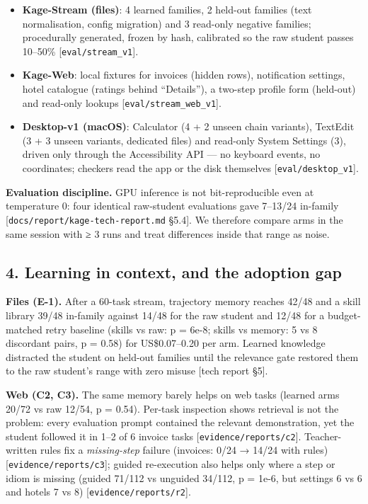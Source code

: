 \documentclass[
  10pt,
]{article}
\providecommand{\tightlist}{%
  \setlength{\itemsep}{0pt}\setlength{\parskip}{0pt}}
\begin{document}
\begin{itemize}
\tightlist
\item
  \textbf{Kage-Stream (files)}: 4 learned families, 2 held-out families
  (text normalisation, config migration) and 3 read-only negative
  families; procedurally generated, frozen by hash, calibrated so the
  raw student passes 10--50\% {[}\texttt{eval/stream\_v1}{]}.
\item
  \textbf{Kage-Web}: local fixtures for invoices (hidden rows),
  notification settings, hotel catalogue (ratings behind ``Details''), a
  two-step profile form (held-out) and read-only lookups
  {[}\texttt{eval/stream\_web\_v1}{]}.
\item
  \textbf{Desktop-v1 (macOS)}: Calculator (4 + 2 unseen chain variants),
  TextEdit (3 + 3 unseen variants, dedicated files) and read-only System
  Settings (3), driven only through the Accessibility API --- no
  keyboard events, no coordinates; checkers read the app or the disk
  themselves {[}\texttt{eval/desktop\_v1}{]}.
\end{itemize}

\textbf{Evaluation discipline.} GPU inference is not bit-reproducible
even at temperature 0: four identical raw-student evaluations gave
7--13/24 in-family {[}\texttt{docs/report/kage-tech-report.md} §5.4{]}.
We therefore compare arms in the same session with ≥ 3 runs and treat
differences inside that range as noise.

\subsection{4. Learning in context, and the adoption
gap}\label{learning-in-context-and-the-adoption-gap}

\textbf{Files (E-1).} After a 60-task stream, trajectory memory reaches
42/48 and a skill library 39/48 in-family against 14/48 for the raw
student and 12/48 for a budget-matched retry baseline (skills vs raw: p
= 6e-8; skills vs memory: 5 vs 8 discordant pairs, p = 0.58) for
US\$0.07--0.20 per arm. Learned knowledge distracted the student on
held-out families until the relevance gate restored them to the raw
student's range with zero misuse {[}tech report §5{]}.

\textbf{Web (C2, C3).} The same memory barely helps on web tasks
(learned arms 20/72 vs raw 12/54, p = 0.54). Per-task inspection shows
retrieval is not the problem: every evaluation prompt contained the
relevant demonstration, yet the student followed it in 1--2 of 6 invoice
tasks {[}\texttt{evidence/reports/c2}{]}. Teacher-written rules fix a
\emph{missing-step} failure (invoices: 0/24 → 14/24 with rules)
{[}\texttt{evidence/reports/c3}{]}; guided re-execution also helps only
where a step or idiom is missing (guided 71/112 vs unguided 34/112, p =
1e-6, but settings 6 vs 6 and hotels 7 vs 8)
{[}\texttt{evidence/reports/r2}{]}.
\end{document}
